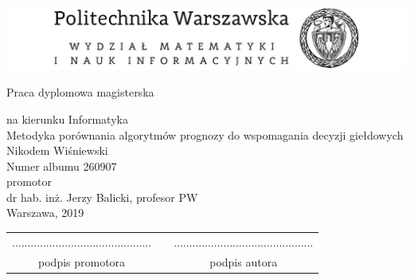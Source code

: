 \documentclass[a4paper, twoside, 11pt, openright]{article}
\newcommand{\myTitle}{Metodyka porównania algorytmów prognozy do wspomagania decyzji giełdowych}
\newcommand{\myName}{Nikodem Wiśniewski}
\newcommand{\myNumber}{260907}
\newcommand{\myThesisType}{Praca dyplomowa magisterska}
\newcommand{\myCourse}{Informatyka}
\newcommand{\myProf}{dr hab. inż. Jerzy Balicki, profesor PW}
\newcommand{\myYear}{2019}
\newcommand{\fncyfront}{%
	\fancyhead[RO]{}
	\fancyfoot[RO]{}
	\fancyhead[LE]{}
	\fancyfoot[LE]{}
	\fancyhead[RE,LO]{}
	\fancyfoot[C]{}
	\renewcommand{\headrulewidth}{0pt}}
\begin{document}
\fncyfront
\begin{titlepage}
\begingroup
\begin{center}		
			\includegraphics[width=1.0\textwidth]{img/pw_header}
			
			\vspace{1.0cm}
			\fontsize{24}{30}\selectfont\myThesisType
			\fontsize{12}{14}\selectfont
			
			\vspace{0.5cm}
			na kierunku \myCourse \\
			\vspace{1cm}
			{\fontsize{14}{18}\selectfont \myTitle} \\ 
			
			\vspace{1.5cm}
			\fontsize{21}{25}\selectfont \myName \\
			\fontsize{12}{14}\selectfont
			Numer albumu \myNumber \\

			\vspace{6.5cm}
			promotor \\
			\myProf \\
			\vspace{0.5cm}
			\vfill 
			Warszawa, \myYear
        \vfill                      
\end{center}
\endgroup
\end{titlepage}

\cleardoublepage

\begingroup
\fontsize{12pt}{14.4pt}\selectfont


\begin{abstract}
	Głównym celem pracy było opracowanie oraz porównanie modeli predykcyjnych pomagających w podejmowaniu decyzji maklerowi giełdowemu.

\bigskip

	\noindent \textbf{Słowa kluczowe:} giełda, predykcja, klasyfikacja, sieci neuronowe
\end{abstract}

\cleardoublepage


\hfill
\begin{table}[b]
\centering
\begin{tabular}[t]{ccc}
............................................. & \hspace*{100pt} & .............................................\\
podpis promotora & \hspace*{100pt} & podpis autora
\end{tabular}
\end{table}
\end{document}
